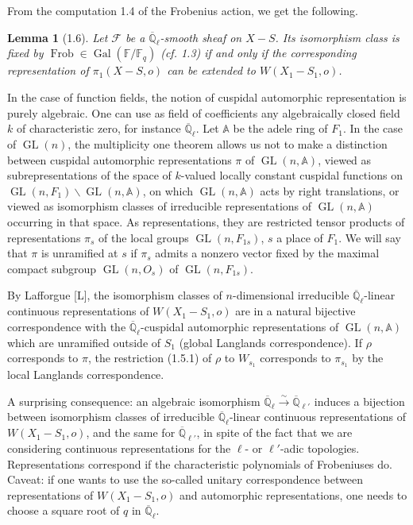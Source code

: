 \documentclass[10pt]{article}
\newcommand{\Fq}{\mathbb F_q}
\newcommand{\Fb}{\mathbb F}
\newcommand{\Ql}{\overline{\mathbb Q}_{\ell}}
\newcommand{\Adele}{\mathbb A}
\newcommand{\GL}{\operatorname{GL}}
\newcommand{\Gal}{\operatorname{Gal}}
\newcommand{\Frob}{\operatorname{Frob}}
\theoremstyle{deligne}
\newtheorem*{lemma*}{Lemma}
\newcommand{\heading}[1]{\vspace{0.7em}\noindent{\bfseries #1}\quad}
\begin{document}
From the computation 1.4 of the Frobenius action, we get the following.

\begin{lemma*}[1.6]
Let $\mathcal F$ be a $\Ql$-smooth sheaf on $X-S$. Its isomorphism class is fixed by $\Frob\in\Gal(\Fb/\Fq)$ (cf. 1.3) if and only if the corresponding representation of $\pi_1(X-S,o)$ can be extended to $W(X_1-S_1,o)$.
\end{lemma*}

\heading{1.7.} In the case of function fields, the notion of cuspidal automorphic representation is purely algebraic. One can use as field of coefficients any algebraically closed field $k$ of characteristic zero, for instance $\Ql$. Let $\Adele$ be the adele ring of $F_1$. In the case of $\GL(n)$, the multiplicity one theorem allows us not to make a distinction between cuspidal automorphic representations $\pi$ of $\GL(n,\Adele)$, viewed as subrepresentations of the space of $k$-valued locally constant cuspidal functions on $\GL(n,F_1)\backslash\GL(n,\Adele)$, on which $\GL(n,\Adele)$ acts by right translations, or viewed as isomorphism classes of irreducible representations of $\GL(n,\Adele)$ occurring in that space. As representations, they are restricted tensor products of representations $\pi_s$ of the local groups $\GL(n,F_{1s})$, $s$ a place of $F_1$. We will say that $\pi$ is unramified at $s$ if $\pi_s$ admits a nonzero vector fixed by the maximal compact subgroup $\GL(n,O_s)$ of $\GL(n,F_{1s})$.

By Lafforgue [L], the isomorphism classes of $n$-dimensional irreducible $\Ql$-linear continuous representations of $W(X_1-S_1,o)$ are in a natural bijective correspondence with the $\Ql$-cuspidal automorphic representations of $\GL(n,\Adele)$ which are unramified outside of $S_1$ (global Langlands correspondence). If $\rho$ corresponds to $\pi$, the restriction (1.5.1) of $\rho$ to $W_{s_1}$ corresponds to $\pi_{s_1}$ by the local Langlands correspondence.

A surprising consequence: an algebraic isomorphism $\Ql\overset{\sim}{\to}\overline{\mathbb Q}_{\ell'}$ induces a bijection between isomorphism classes of irreducible $\Ql$-linear continuous representations of $W(X_1-S_1,o)$, and the same for $\overline{\mathbb Q}_{\ell'}$, in spite of the fact that we are considering continuous representations for the $\ell$- or $\ell'$-adic topologies. Representations correspond if the characteristic polynomials of Frobeniuses do. Caveat: if one wants to use the so-called unitary correspondence between representations of $W(X_1-S_1,o)$ and automorphic representations, one needs to choose a square root of $q$ in $\Ql$.
\end{document}

